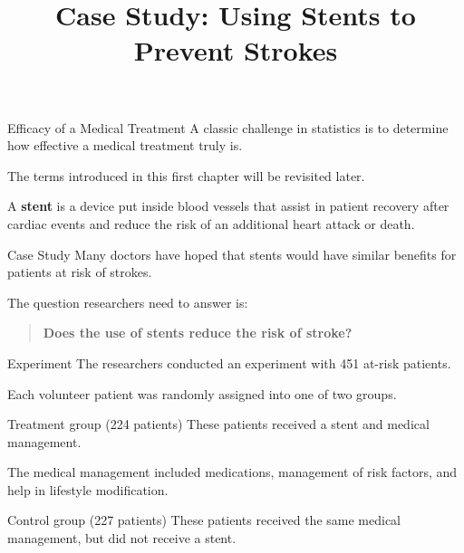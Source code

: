 \documentclass{beamer}
\title[MA205 - Section 1.1]{Case Study: Using Stents to Prevent Strokes}
\begin{document}
\begin{frame}
\titlepage
\end{frame}

\begin{frame}
\begin{block}{Efficacy of a Medical Treatment}
A classic challenge in statistics is to determine how effective a medical treatment truly is.
\end{block}\pause

\begin{note}
The terms introduced in this first chapter will be revisited later. 
\end{note}\pause

\begin{definition}
A \textbf{stent} is a device put inside blood vessels that assist in patient recovery after cardiac events and reduce the risk of an additional heart attack or death.
\end{definition}\pause

\begin{block}{Case Study}
Many doctors have hoped that stents would have similar benefits for patients at risk of strokes.\pause

\vspace{2mm}
The question researchers need to answer is: 
\blockquote{\textbf{Does the use of stents reduce the risk of stroke?}}
\end{block}
\end{frame}

\begin{frame}
\begin{block}{Experiment}
The researchers conducted an experiment with 451 at-risk patients.

Each volunteer patient was randomly assigned into one of two groups.
\end{block}\pause

\begin{block}{Treatment group (224 patients)}
These patients received a stent and medical management. 
\end{block}\pause

\begin{note}
The medical management included medications, management of risk factors, and help in lifestyle modification.
\end{note}\pause

\begin{block}{Control group (227 patients)}
These patients received the same medical management, but did not receive a stent.
\end{block}
\end{frame}
\end{document}

